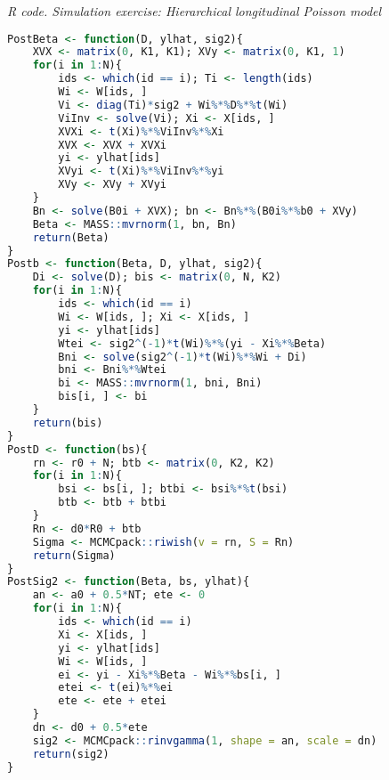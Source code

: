 \begin{tcolorbox}[enhanced,width=4.67in,center upper,
	fontupper=\large\bfseries,drop shadow southwest,sharp corners]
	\textit{R code. Simulation exercise: Hierarchical longitudinal Poisson model}
	\begin{VF}
		\begin{lstlisting}[language=R]
PostBeta <- function(D, ylhat, sig2){
	XVX <- matrix(0, K1, K1); XVy <- matrix(0, K1, 1)
	for(i in 1:N){
		ids <- which(id == i); Ti <- length(ids)
		Wi <- W[ids, ]
		Vi <- diag(Ti)*sig2 + Wi%*%D%*%t(Wi)
		ViInv <- solve(Vi); Xi <- X[ids, ]
		XVXi <- t(Xi)%*%ViInv%*%Xi
		XVX <- XVX + XVXi
		yi <- ylhat[ids]
		XVyi <- t(Xi)%*%ViInv%*%yi
		XVy <- XVy + XVyi
	}
	Bn <- solve(B0i + XVX); bn <- Bn%*%(B0i%*%b0 + XVy)
	Beta <- MASS::mvrnorm(1, bn, Bn)
	return(Beta)
}
Postb <- function(Beta, D, ylhat, sig2){
	Di <- solve(D); bis <- matrix(0, N, K2)
	for(i in 1:N){
		ids <- which(id == i)
		Wi <- W[ids, ]; Xi <- X[ids, ]
		yi <- ylhat[ids]
		Wtei <- sig2^(-1)*t(Wi)%*%(yi - Xi%*%Beta)
		Bni <- solve(sig2^(-1)*t(Wi)%*%Wi + Di)
		bni <- Bni%*%Wtei
		bi <- MASS::mvrnorm(1, bni, Bni)
		bis[i, ] <- bi
	}
	return(bis)
}
PostD <- function(bs){
	rn <- r0 + N; btb <- matrix(0, K2, K2)
	for(i in 1:N){
		bsi <- bs[i, ]; btbi <- bsi%*%t(bsi)
		btb <- btb + btbi
	}
	Rn <- d0*R0 + btb
	Sigma <- MCMCpack::riwish(v = rn, S = Rn)
	return(Sigma)
}
PostSig2 <- function(Beta, bs, ylhat){
	an <- a0 + 0.5*NT; ete <- 0
	for(i in 1:N){
		ids <- which(id == i)
		Xi <- X[ids, ]
		yi <- ylhat[ids]
		Wi <- W[ids, ]
		ei <- yi - Xi%*%Beta - Wi%*%bs[i, ]
		etei <- t(ei)%*%ei
		ete <- ete + etei
	}
	dn <- d0 + 0.5*ete 
	sig2 <- MCMCpack::rinvgamma(1, shape = an, scale = dn)
	return(sig2)
}
\end{lstlisting}
	\end{VF}
\end{tcolorbox}


